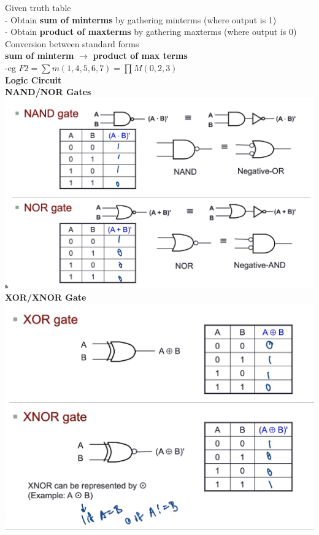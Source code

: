 \documentclass[10pt, a4paper]{article}
\begin{document}
\begin{multicols*}{3}
		Given truth table\\
		- Obtain \textbf{sum of minterms} by gathering minterms (where output is 1)\\
		- Obtain \textbf{product of maxterms} by gathering maxterms (where output is 0)\\
		
		Conversion between standard forms\\
		\textbf{sum of minterm} $\rightarrow$ \textbf{product of max terms}\\
		-eg $F2 = \sum m(1,4,5,6,7) = \prod M(0,2,3)$\\
		
		{\normalsize\textbf{Logic Circuit}}\\
		\textbf{NAND/NOR Gates}\\
		\includegraphics[scale=.35]{./assets/NANDNOR}\\
		
		\textbf{XOR/XNOR Gate}\\
		\includegraphics[scale=.4]{./assets/XORXNOR}\\
		

\end{multicols*}
\end{document}
